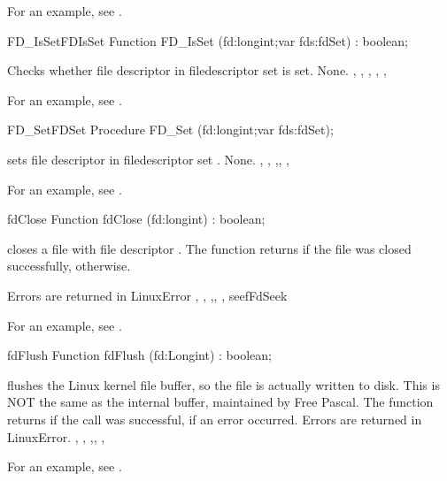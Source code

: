 For an example, see .
\begin{functionl}{FD\_IsSet}{FDIsSet}
\Declaration
Function FD\_IsSet (fd:longint;var fds:fdSet) : boolean;

\Description
{} Checks whether file descriptor  in filedescriptor set 
is set.
\Errors
None.
\SeeAlso
{}, , ,
, 
,
\end{functionl}
For an example, see .
\begin{procedurel}{FD\_Set}{FDSet}
\Declaration
Procedure FD\_Set (fd:longint;var fds:fdSet);

\Description
{} sets file descriptor  in filedescriptor set .
\Errors
None.
\SeeAlso
{}, , ,, 
, 
\end{procedurel}
For an example, see .
\begin{function}{fdClose}
\Declaration
Function fdClose (fd:longint) : boolean;

\Description

 closes a file with file descriptor . The function
returns  if the file was closed successfully, 
otherwise. 

\Errors
Errors are returned in LinuxError
\SeeAlso
{}, , ,,
, seef{FdSeek}
\end{function}
For an example, see .
\begin{function}{fdFlush}
\Declaration
Function fdFlush (fd:Longint) : boolean;

\Description
{} flushes the Linux kernel file buffer, so the file is actually
written to disk. This is NOT the same as the internal buffer, maintained by
Free Pascal. 
The function returns  if the call was successful,  if
an error occurred.
\Errors
Errors are returned in LinuxError.
\SeeAlso
{}, , ,,
, 
\end{function}
For an example, see .
